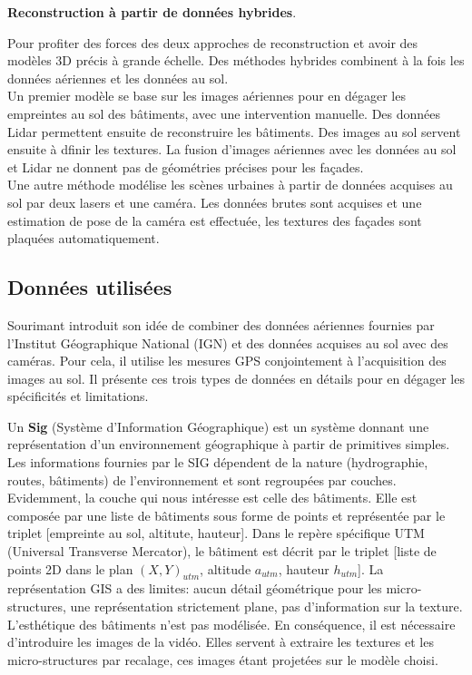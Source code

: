 \documentclass[11pt]{article}
\begin{document}
\textbf{Reconstruction à partir de données hybrides}.

Pour profiter des forces des deux approches de reconstruction et avoir des modèles 3D précis à grande échelle. Des méthodes hybrides combinent à la fois les données aériennes et les données au sol.\\
Un premier modèle se base sur les images aériennes pour en dégager les empreintes au sol des bâtiments, avec une intervention manuelle. Des données Lidar permettent ensuite de reconstruire les bâtiments. Des images au sol servent ensuite à dfinir les textures. La fusion d'images aériennes avec les données au sol et Lidar ne donnent pas de géométries précises pour les façades.\\
Une autre méthode modélise les scènes urbaines à partir de données acquises au sol par deux lasers et une caméra. Les données brutes sont acquises et une estimation de pose de la caméra est effectuée, les textures des façades sont plaquées automatiquement. 

\subsection{Données utilisées}

Sourimant introduit son idée de combiner des données aériennes fournies par l'Institut Géographique National (IGN) et des données acquises au sol avec des caméras. Pour cela, il utilise les mesures GPS conjointement à l'acquisition des images au sol. Il présente ces trois types de données en détails pour en dégager les spécificités et limitations.

Un \textbf{Sig} (Système d'Information Géographique) est un système donnant une représentation d'un environnement géographique à partir de primitives simples. Les informations fournies par le SIG dépendent de la nature (hydrographie, routes, bâtiments) de l'environnement et sont regroupées par couches. Evidemment, la couche qui nous intéresse est celle des bâtiments. Elle est composée par une liste de bâtiments sous forme de points et représentée par le triplet [empreinte au sol, altitute, hauteur]. Dans le repère spécifique UTM (Universal Transverse Mercator), le bâtiment est décrit par le triplet [liste de  points 2D dans le plan $(X,Y)_{utm}$, altitude $a_{utm}$, hauteur $h_{utm}$]. La représentation GIS a des limites: aucun détail géométrique pour les micro-structures, une représentation strictement plane, pas d'information sur la texture. L'esthétique des bâtiments n'est pas modélisée. En conséquence, il est nécessaire d'introduire les images de la vidéo. Elles servent à extraire les textures et les micro-structures par recalage, ces images étant projetées sur le modèle choisi.
\end{document}
